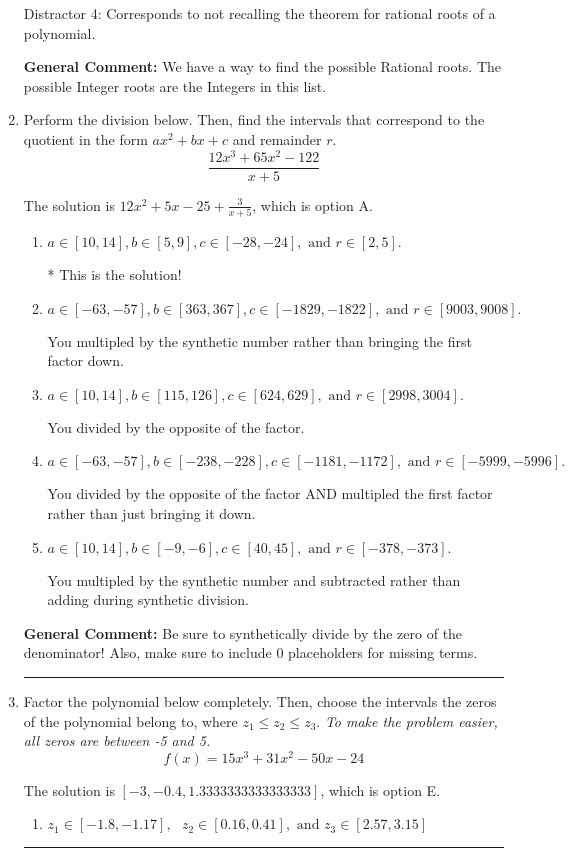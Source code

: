 \documentclass{extbook}[14pt]
\newcommand{\litem}[1]{\item #1

\rule{\textwidth}{0.4pt}}
\begin{document}
\begin{enumerate}
{\begin{enumerate}[label=\Alph*.]
 Distractor 4: Corresponds to not recalling the theorem for rational roots of a polynomial.
\end{enumerate}

\textbf{General Comment:} We have a way to find the possible Rational roots. The possible Integer roots are the Integers in this list.
}
\litem{
Perform the division below. Then, find the intervals that correspond to the quotient in the form $ax^2+bx+c$ and remainder $r$.
\[ \frac{12x^{3} +65 x^{2} -122}{x + 5} \]

The solution is \( 12x^{2} +5 x -25 + \frac{3}{x + 5} \), which is option A.\begin{enumerate}[label=\Alph*.]
\item \( a \in [10, 14], b \in [5, 9], c \in [-28, -24], \text{ and } r \in [2, 5]. \)

* This is the solution!
\item \( a \in [-63, -57], b \in [363, 367], c \in [-1829, -1822], \text{ and } r \in [9003, 9008]. \)

 You multipled by the synthetic number rather than bringing the first factor down.
\item \( a \in [10, 14], b \in [115, 126], c \in [624, 629], \text{ and } r \in [2998, 3004]. \)

 You divided by the opposite of the factor.
\item \( a \in [-63, -57], b \in [-238, -228], c \in [-1181, -1172], \text{ and } r \in [-5999, -5996]. \)

 You divided by the opposite of the factor AND multipled the first factor rather than just bringing it down.
\item \( a \in [10, 14], b \in [-9, -6], c \in [40, 45], \text{ and } r \in [-378, -373]. \)

 You multipled by the synthetic number and subtracted rather than adding during synthetic division.
\end{enumerate}

\textbf{General Comment:} Be sure to synthetically divide by the zero of the denominator! Also, make sure to include 0 placeholders for missing terms.
}
\litem{
Factor the polynomial below completely. Then, choose the intervals the zeros of the polynomial belong to, where $z_1 \leq z_2 \leq z_3$. \textit{To make the problem easier, all zeros are between -5 and 5.}
\[ f(x) = 15x^{3} +31 x^{2} -50 x -24 \]

The solution is \( [-3, -0.4, 1.3333333333333333] \), which is option E.\begin{enumerate}[label=\Alph*.]
\item \( z_1 \in [-1.8, -1.17], \text{   }  z_2 \in [0.16, 0.41], \text{   and   } z_3 \in [2.57, 3.15] \)


\end{enumerate}}
\end{enumerate}
\end{document}
